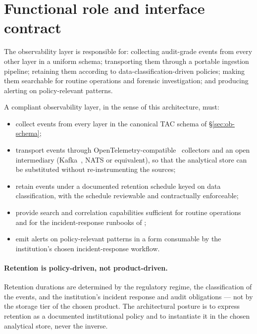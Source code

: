 \section{Functional role and interface contract}
\label{sec:ob-contract}

The observability layer is responsible for: collecting audit-grade
events from every other layer in a uniform schema; transporting
them through a portable ingestion pipeline; retaining them
according to data-classification-driven policies; making them
searchable for routine operations and forensic investigation; and
producing alerting on policy-relevant patterns.

\begin{contractbox}
\noindent A compliant observability layer, in the sense of this
architecture, must:

\begin{itemize}[leftmargin=1.5em,nosep]
  \item collect events from every layer in the canonical TAC schema
    of \S\ref{sec:ob-schema};
  \item transport events through
    OpenTelemetry-compatible~\cite{opentelemetry-spec} collectors
    and an open intermediary (Kafka~\cite{kafka}, NATS or
    equivalent), so that the analytical store can be substituted
    without re-instrumenting the sources;
  \item retain events under a documented retention schedule keyed
    on data classification, with the schedule reviewable and
    contractually enforceable;
  \item provide search and correlation capabilities sufficient for
    routine operations and for the incident-response runbooks of
    ;
  \item emit alerts on policy-relevant patterns in a form
    consumable by the institution's chosen incident-response
    workflow.
\end{itemize}
\end{contractbox}

\paragraph{Retention is policy-driven, not product-driven.}
Retention durations are determined by the regulatory regime, the
classification of the events, and the institution's incident
response and audit obligations --- not by the storage tier of the
chosen product. The architectural posture is to express retention
as a documented institutional policy and to instantiate it in the
chosen analytical store, never the inverse.

